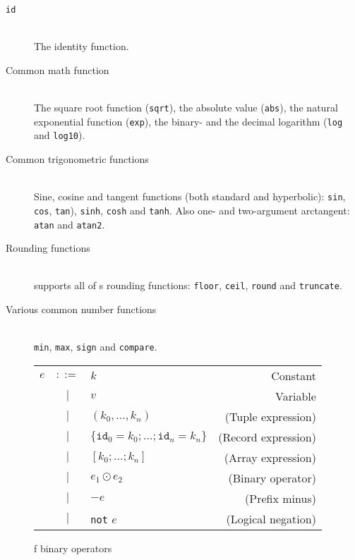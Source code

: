 \begin{description}
\item[\texttt{id}]\hfill\\
  The identity function.

\item[Common math function]\hfill\\
  The square root function (\texttt{sqrt}), the absolute value (\texttt{abs}),
  the natural exponential function (\texttt{exp}), the binary- and the decimal
  logarithm (\texttt{log} and \texttt{log10}).
  
\item[Common trigonometric functions]\hfill\\
  Sine, cosine and tangent functions (both standard and hyperbolic):
  \texttt{sin}, \texttt{cos}, \texttt{tan}), \texttt{sinh}, \texttt{cosh} and \texttt{tanh}.
  Also one- and two-argument arctangent: \texttt{atan} and \texttt{atan2}.

\item[Rounding functions]\hfill\\
  \fshark{} supports all of \fsharp{}s rounding functions:
  \texttt{floor}, \texttt{ceil}, \texttt{round} and \texttt{truncate}.
  
\item[Various common number functions]\hfill\\
  \texttt{min}, \texttt{max}, \texttt{sign} and \texttt{compare}.

  

\end{description}







\begin{figure}
  \centering
  \begin{tabular}{lclr}
    $e$ & $::=$ & $k$ & Constant \\
        & $|$   & $v$ & Variable \\
        & $|$   & $(k_0 , \ldots , k_n)$ & (Tuple expression) \\
        & $|$   & $\{\texttt{id}_0=k_0 ; \ldots ; \texttt{id}_n=k_n\}$ & (Record expression) \\
        & $|$   & $[k_0 ; \ldots ; k_n]$ & (Array expression) \\
        & $|$   & $e_1 \odot e_2$ & (Binary operator) \\
        & $|$   & $-e$ & (Prefix minus) \\
        & $|$   & \texttt{not} $e$ & (Logical negation) \\
  \end{tabular}
  \caption{f binary operators}
\end{figure}

